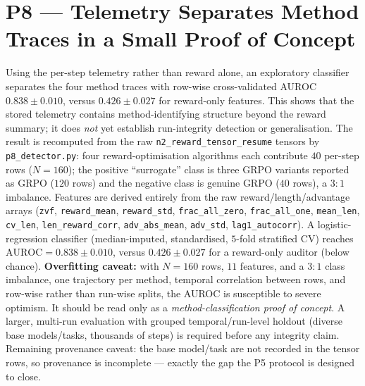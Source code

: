 \documentclass[12pt,a4paper]{report}
\begin{document}
\section{P8 --- Telemetry Separates Method Traces in a Small Proof of Concept}
Using the per-step telemetry rather than reward alone, an exploratory classifier
separates the four method traces with row-wise cross-validated AUROC $0.838\pm0.010$,
versus $0.426\pm0.027$ for reward-only features. This shows that the stored telemetry
contains method-identifying structure beyond the reward summary; it does \emph{not}
yet establish run-integrity detection or generalisation. The result is
recomputed from the raw \texttt{n2\_reward\_tensor\_resume} tensors by
\texttt{p8\_detector.py}: four reward-optimisation algorithms each contribute $40$
per-step rows ($N=160$); the positive ``surrogate'' class is three GRPO variants
reported as GRPO ($120$ rows) and the negative class is genuine GRPO ($40$ rows), a
$3{:}1$ imbalance. Features are derived entirely from the raw reward/length/advantage
arrays (\texttt{zvf}, \texttt{reward\_mean}, \texttt{reward\_std},
\texttt{frac\_all\_zero}, \texttt{frac\_all\_one}, \texttt{mean\_len},
\texttt{cv\_len}, \texttt{len\_reward\_corr}, \texttt{adv\_abs\_mean},
\texttt{adv\_std}, \texttt{lag1\_autocorr}). A logistic-regression classifier
(median-imputed, standardised, $5$-fold stratified CV) reaches
$\mathrm{AUROC}=0.838\pm0.010$, versus $0.426\pm0.027$ for a reward-only auditor
(below chance). \textbf{Overfitting caveat:} with $N=160$ rows, $11$ features, and a
$3{:}1$ class imbalance, one trajectory per method, temporal correlation between rows,
and row-wise rather than run-wise splits, the AUROC is susceptible to severe optimism.
It should be read only as a \emph{method-classification proof of concept}. A larger,
multi-run evaluation with grouped temporal/run-level holdout (diverse base
models/tasks, thousands of steps) is required before any integrity claim. Remaining provenance caveat: the base
model/task are not recorded in the tensor rows, so provenance is incomplete --- exactly
the gap the P5 protocol is designed to close.
\end{document}
